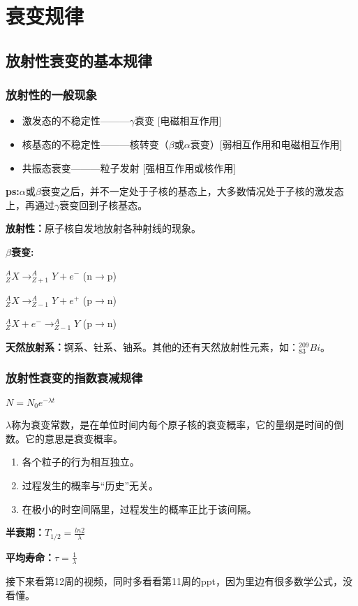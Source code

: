\chapter{衰变规律}

\section{放射性衰变的基本规律}

\subsection{放射性的一般现象}

\begin{itemize}
    \item 激发态的不稳定性———$\gamma$衰变 [电磁相互作用]
    \item 核基态的不稳定性———核转变（$\beta$或$\alpha$衰变）[弱相互作用和电磁相互作用]
    \item 共振态衰变———粒子发射 [强相互作用或核作用]
\end{itemize}

\textbf{ps:}$\alpha$或$\beta$衰变之后，并不一定处于子核的基态上，大多数情况处于子核的激发态上，再通过$\gamma$衰变回到子核基态。

\textbf{放射性：}原子核自发地放射各种射线的现象。

\textbf{$\beta$衰变:}

$^A_ZX \rightarrow ^A_{Z+1}Y + e^-$ (n$\rightarrow$p)

$^A_ZX \rightarrow ^A_{Z-1}Y + e^+$ (p$\rightarrow$n)

$^A_ZX + e^- \rightarrow ^A_{Z-1}Y$ (p$\rightarrow$n)

\textbf{天然放射系：}锕系、钍系、铀系。其他的还有天然放射性元素，如：$^{209}_{83}Bi$。

\subsection{放射性衰变的指数衰减规律}

$N=N_0e^{-\lambda t}$

$\lambda $称为衰变常数，是在单位时间内每个原子核的衰变概率，它的量纲是时间的倒数。它的意思是衰变概率。

\begin{enumerate}
    \item 各个粒子的行为相互独立。
    \item 过程发生的概率与“历史”无关。
    \item 在极小的时空间隔里，过程发生的概率正比于该间隔。
\end{enumerate}

\vspace{1.2em}

\textbf{半衰期：}$T_{1/2}=\frac{ln2}{\lambda} $

\textbf{平均寿命：}$\tau =\frac{1}{\lambda}$

接下来看第12周的视频，同时多看看第11周的ppt，因为里边有很多数学公式，没看懂。